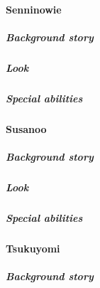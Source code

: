 \documentclass[parskip=full]{scrartcl}
\begin{document}
							\par \endgroup
					\paragraph{Senninowie}\vspace{-0.5cm}
						\subparagraph{Background story} \vspace{-0.5cm}
							\par \begingroup
							\leftskip=2cm
							\noindent
							
							\par \endgroup
						\subparagraph{Look} \vspace{-0.5cm}
							\par \begingroup
							\leftskip=2cm
							\noindent
							
							\par \endgroup
						\subparagraph{Special abilities} \vspace{-0.5cm}
							\par \begingroup
							\leftskip=2cm
							\noindent
							
							\par \endgroup
					\paragraph{Susanoo}\vspace{-0.5cm}
						\subparagraph{Background story} \vspace{-0.5cm}
							\par \begingroup
							\leftskip=2cm
							\noindent
							
							\par \endgroup
						\subparagraph{Look} \vspace{-0.5cm}
							\par \begingroup
							\leftskip=2cm
							\noindent
							
							\par \endgroup
						\subparagraph{Special abilities} \vspace{-0.5cm}
							\par \begingroup
							\leftskip=2cm
							\noindent
							
							\par \endgroup
					\paragraph{Tsukuyomi}\vspace{-0.5cm}
						\subparagraph{Background story} \vspace{-0.5cm}
							\par \begingroup
							\leftskip=2cm
							\noindent
							
\end{document}
